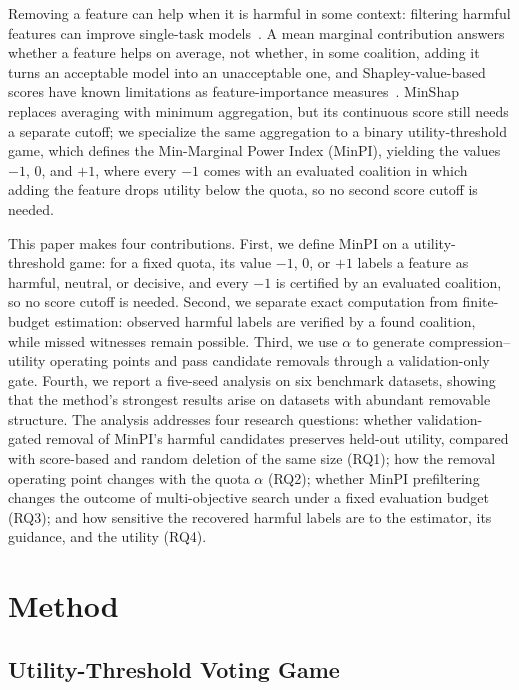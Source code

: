\documentclass{article}
\begin{document}
Removing a feature can help when it is harmful in some context: filtering harmful features can improve single-task models~\citep{lippl2024inductive}. A mean marginal contribution answers whether a feature helps on average, not whether, in some coalition, adding it turns an acceptable model into an unacceptable one, and Shapley-value-based scores have known limitations as feature-importance measures~\citep{kumar2020problems}. MinShap~\citep{zheng2026minshap} replaces averaging with minimum aggregation, but its continuous score still needs a separate cutoff; we specialize the same aggregation to a binary utility-threshold game, which defines the Min-Marginal Power Index (MinPI), yielding the values $-1$, $0$, and $+1$, where every $-1$ comes with an evaluated coalition in which adding the feature drops utility below the quota, so no second score cutoff is needed.

This paper makes four contributions. First, we define MinPI on a utility-threshold game: for a fixed quota, its value $-1$, $0$, or $+1$ labels a feature as harmful, neutral, or decisive, and every $-1$ is certified by an evaluated coalition, so no score cutoff is needed. Second, we separate exact computation from finite-budget estimation: observed harmful labels are verified by a found coalition, while missed witnesses remain possible. Third, we use $\alpha$ to generate compression--utility operating points and pass candidate removals through a validation-only gate. Fourth, we report a five-seed analysis on six benchmark datasets, showing that the method's strongest results arise on datasets with abundant removable structure. The analysis addresses four research questions: whether validation-gated removal of MinPI's harmful candidates preserves held-out utility, compared with score-based and random deletion of the same size (RQ1); how the removal operating point changes with the quota $\alpha$ (RQ2); whether MinPI prefiltering changes the outcome of multi-objective search under a fixed evaluation budget (RQ3); and how sensitive the recovered harmful labels are to the estimator, its guidance, and the utility (RQ4).

\section{Method}
\label{sec:method}

\subsection{Utility-Threshold Voting Game}
\end{document}
